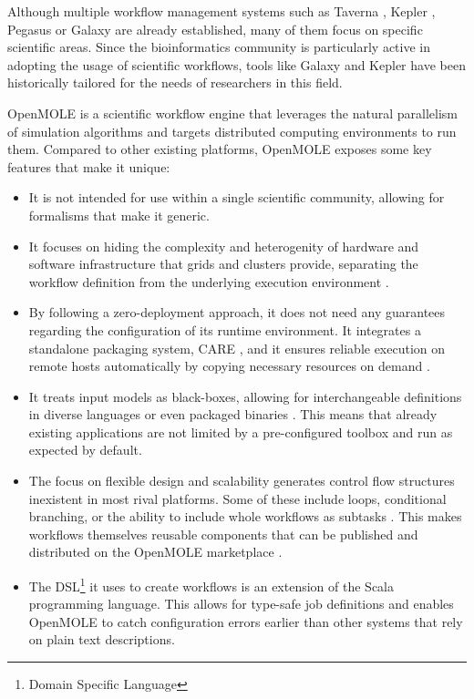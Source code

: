 Although multiple workflow management systems such as Taverna \cite{Taverna}, Kepler \cite{Kepler}, Pegasus \cite{Pegasus} or Galaxy \cite{Galaxy} are already established, many of them focus on specific scientific areas. Since the bioinformatics community is particularly active in adopting the usage of scientific workflows, tools like Galaxy and Kepler have been historically tailored for the needs of researchers in this field.

OpenMOLE \cite{Reuillon2013} is a scientific workflow engine that leverages the natural parallelism of simulation algorithms and targets distributed computing environments to run them. Compared to other existing platforms, OpenMOLE exposes some key features that make it unique:

\begin{itemize}
	\item It is not intended for use within a single scientific community, allowing for formalisms that make it generic.
	\item It focuses on hiding the complexity and heterogenity of hardware and software infrastructure that grids and clusters provide, separating the workflow definition from the underlying execution environment \cite{Reuillon2010}.
	\item By following a zero-deployment approach, it does not need any guarantees regarding the configuration of its runtime environment. It integrates a standalone packaging system, CARE \cite{Janin2014}, and it ensures reliable execution on remote hosts automatically by copying necessary resources on demand \cite{Reuillon2015}.
	\item It treats input models as black-boxes, allowing for interchangeable definitions in diverse languages or even packaged binaries \cite{Reuillon2013}. This means that already existing applications are not limited by a pre-configured toolbox and run as expected by default.
	\item The focus on flexible design and scalability generates control flow structures inexistent in most rival platforms. Some of these include loops, conditional branching, or the ability to include whole workflows as subtasks \cite{Reuillon2013}. This makes workflows themselves reusable components that can be published and distributed on the OpenMOLE marketplace \cite{OpenMOLEMarketplace}.
	\item The DSL\footnote{Domain Specific Language} it uses to create workflows is an extension of the Scala \cite{Scala} programming language. This allows for type-safe job definitions and enables OpenMOLE to catch configuration errors earlier than other systems that rely on plain text descriptions.
\end{itemize}

